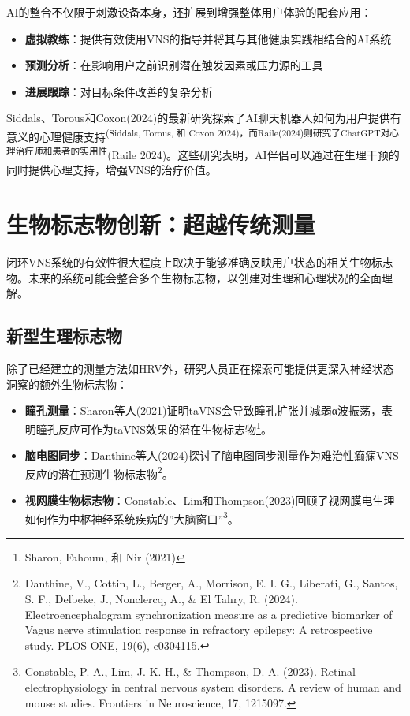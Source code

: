 \documentclass[
  Letterpaper,
]{scrbook}
\providecommand{\tightlist}{%
  \setlength{\itemsep}{0pt}\setlength{\parskip}{0pt}}\usepackage{longtable,booktabs,array}
\begin{document}
AI的整合不仅限于刺激设备本身，还扩展到增强整体用户体验的配套应用：

\begin{itemize}
\tightlist
\item
  \textbf{虚拟教练}：提供有效使用VNS的指导并将其与其他健康实践相结合的AI系统
\item
  \textbf{预测分析}：在影响用户之前识别潜在触发因素或压力源的工具
\item
  \textbf{进展跟踪}：对目标条件改善的复杂分析
\end{itemize}

Siddals、Torous和Coxon(2024)的最新研究探索了AI聊天机器人如何为用户提供有意义的心理健康支持\textsuperscript{(Siddals,
Torous, 和 Coxon
2024)，而Raile(2024)则研究了ChatGPT对心理治疗师和患者的实用性}(Raile
2024)。这些研究表明，AI伴侣可以通过在生理干预的同时提供心理支持，增强VNS的治疗价值。

\section{生物标志物创新：超越传统测量}\label{ux751fux7269ux6807ux5fd7ux7269ux521bux65b0ux8d85ux8d8aux4f20ux7edfux6d4bux91cf}

闭环VNS系统的有效性很大程度上取决于能够准确反映用户状态的相关生物标志物。未来的系统可能会整合多个生物标志物，以创建对生理和心理状况的全面理解。

\subsection{新型生理标志物}\label{ux65b0ux578bux751fux7406ux6807ux5fd7ux7269}

除了已经建立的测量方法如HRV外，研究人员正在探索可能提供更深入神经状态洞察的额外生物标志物：

\begin{itemize}
\tightlist
\item
  \textbf{瞳孔测量}：Sharon等人(2021)证明taVNS会导致瞳孔扩张并减弱α波振荡，表明瞳孔反应可作为taVNS效果的潜在生物标志物\footnote{Sharon,
    Fahoum, 和 Nir (2021)}。
\item
  \textbf{脑电图同步}：Danthine等人(2024)探讨了脑电图同步测量作为难治性癫痫VNS反应的潜在预测生物标志物\footnote{Danthine,
    V., Cottin, L., Berger, A., Morrison, E. I. G., Liberati, G.,
    Santos, S. F., Delbeke, J., Nonclercq, A., \& El Tahry, R. (2024).
    Electroencephalogram synchronization measure as a predictive
    biomarker of Vagus nerve stimulation response in refractory
    epilepsy: A retrospective study. PLOS ONE, 19(6), e0304115.}。
\item
  \textbf{视网膜生物标志物}：Constable、Lim和Thompson(2023)回顾了视网膜电生理如何作为中枢神经系统疾病的''大脑窗口''\footnote{Constable,
    P. A., Lim, J. K. H., \& Thompson, D. A. (2023). Retinal
    electrophysiology in central nervous system disorders. A review of
    human and mouse studies. Frontiers in Neuroscience, 17, 1215097.}。
\end{itemize}
\end{document}
